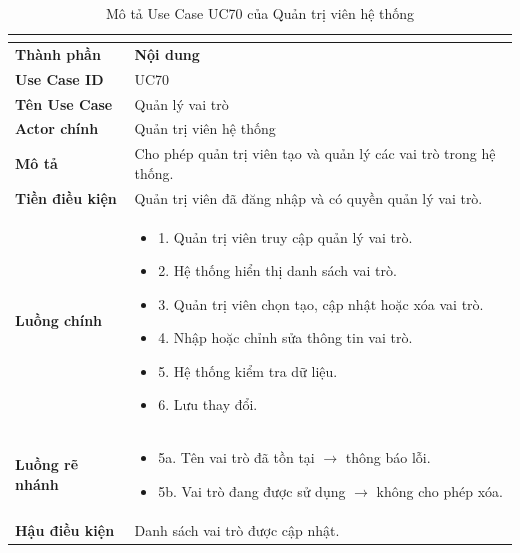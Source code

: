 \begin{longtable}{|C{3cm}|L{11cm}|}
\caption{Mô tả Use Case UC70 của Quản trị viên hệ thống}\\
\label{tab:mo-ta-uc70-quan-tri-vien}\\
\hline
\textbf{Thành phần} & \textbf{Nội dung} \\
\hline
\textbf{Use Case ID} & UC70 \\
\hline
\textbf{Tên Use Case} & Quản lý vai trò \\
\hline
\textbf{Actor chính} & Quản trị viên hệ thống \\
\hline
\textbf{Mô tả} &
Cho phép quản trị viên tạo và quản lý các vai trò trong hệ thống.
\\
\hline
\textbf{Tiền điều kiện} &
Quản trị viên đã đăng nhập và có quyền quản lý vai trò.
\\
\hline
\textbf{Luồng chính} &
\begin{itemize}[leftmargin=*,topsep=2pt,itemsep=2pt]
    \item 1. Quản trị viên truy cập quản lý vai trò.
    \item 2. Hệ thống hiển thị danh sách vai trò.
    \item 3. Quản trị viên chọn tạo, cập nhật hoặc xóa vai trò.
    \item 4. Nhập hoặc chỉnh sửa thông tin vai trò.
    \item 5. Hệ thống kiểm tra dữ liệu.
    \item 6. Lưu thay đổi.
\end{itemize}
\\
\hline
\textbf{Luồng rẽ nhánh} &
\begin{itemize}[leftmargin=*,topsep=2pt,itemsep=2pt]
    \item 5a. Tên vai trò đã tồn tại $\rightarrow$ thông báo lỗi.
    \item 5b. Vai trò đang được sử dụng $\rightarrow$ không cho phép xóa.
\end{itemize}
\\
\hline
\textbf{Hậu điều kiện} &
Danh sách vai trò được cập nhật.
\\
\hline
\end{longtable}


